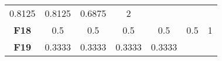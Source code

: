 \documentclass[12pt,a4paper]{article}
\begin{document}
\begin{longtable}[c]{@{}ccccccc@{}}
\begin{minipage}[t]{0.09\columnwidth}\centering\strut
0.8125
\strut\end{minipage} &
\begin{minipage}[t]{0.10\columnwidth}\centering\strut
0.8125
\strut\end{minipage} &
\begin{minipage}[t]{0.11\columnwidth}\centering\strut
0.6875
\strut\end{minipage} &
\begin{minipage}[t]{0.07\columnwidth}\centering\strut
2
\strut\end{minipage}\tabularnewline
\begin{minipage}[t]{0.11\columnwidth}\centering\strut
\textbf{F18}
\strut\end{minipage} &
\begin{minipage}[t]{0.09\columnwidth}\centering\strut
0.5
\strut\end{minipage} &
\begin{minipage}[t]{0.08\columnwidth}\centering\strut
0.5
\strut\end{minipage} &
\begin{minipage}[t]{0.09\columnwidth}\centering\strut
0.5
\strut\end{minipage} &
\begin{minipage}[t]{0.10\columnwidth}\centering\strut
0.5
\strut\end{minipage} &
\begin{minipage}[t]{0.11\columnwidth}\centering\strut
0.5
\strut\end{minipage} &
\begin{minipage}[t]{0.07\columnwidth}\centering\strut
1
\strut\end{minipage}\tabularnewline
\begin{minipage}[t]{0.11\columnwidth}\centering\strut
\textbf{F19}
\strut\end{minipage} &
\begin{minipage}[t]{0.09\columnwidth}\centering\strut
0.3333
\strut\end{minipage} &
\begin{minipage}[t]{0.08\columnwidth}\centering\strut
0.3333
\strut\end{minipage} &
\begin{minipage}[t]{0.09\columnwidth}\centering\strut
0.3333
\strut\end{minipage} &
\begin{minipage}[t]{0.10\columnwidth}\centering\strut
0.3333
\strut\end{minipage} &

\end{longtable}
\end{document}
